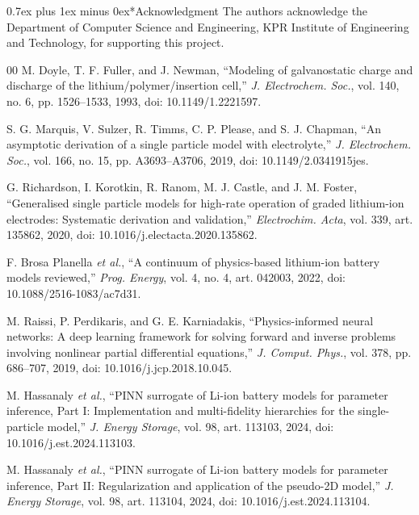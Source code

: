 \documentclass[conference]{IEEEtran}
\makeatletter
\newcommand{\headingfont}{\rmfamily}
\def\section{\@startsection{section}{1}{\z@}{1.5ex plus 1.5ex minus 0.5ex}%
{0.7ex plus 1ex minus 0ex}{\normalfont\headingfont\large\centering\bfseries}}
\makeatother
\begin{document}
\section*{Acknowledgment}
The authors acknowledge the Department of Computer Science and Engineering, KPR Institute of Engineering and Technology, for supporting this project.

\begin{thebibliography}{00}
\setlength{\itemsep}{0pt}
M. Doyle, T. F. Fuller, and J. Newman, ``Modeling of galvanostatic charge and discharge of the lithium/polymer/insertion cell,'' \emph{J. Electrochem. Soc.}, vol. 140, no. 6, pp. 1526--1533, 1993, doi: 10.1149/1.2221597.

S. G. Marquis, V. Sulzer, R. Timms, C. P. Please, and S. J. Chapman, ``An asymptotic derivation of a single particle model with electrolyte,'' \emph{J. Electrochem. Soc.}, vol. 166, no. 15, pp. A3693--A3706, 2019, doi: 10.1149/2.0341915jes.

G. Richardson, I. Korotkin, R. Ranom, M. J. Castle, and J. M. Foster, ``Generalised single particle models for high-rate operation of graded lithium-ion electrodes: Systematic derivation and validation,'' \emph{Electrochim. Acta}, vol. 339, art. 135862, 2020, doi: 10.1016/j.electacta.2020.135862.

F. Brosa Planella \emph{et al.}, ``A continuum of physics-based lithium-ion battery models reviewed,'' \emph{Prog. Energy}, vol. 4, no. 4, art. 042003, 2022, doi: 10.1088/2516-1083/ac7d31.

M. Raissi, P. Perdikaris, and G. E. Karniadakis, ``Physics-informed neural networks: A deep learning framework for solving forward and inverse problems involving nonlinear partial differential equations,'' \emph{J. Comput. Phys.}, vol. 378, pp. 686--707, 2019, doi: 10.1016/j.jcp.2018.10.045.

M. Hassanaly \emph{et al.}, ``PINN surrogate of Li-ion battery models for parameter inference, Part I: Implementation and multi-fidelity hierarchies for the single-particle model,'' \emph{J. Energy Storage}, vol. 98, art. 113103, 2024, doi: 10.1016/j.est.2024.113103.

M. Hassanaly \emph{et al.}, ``PINN surrogate of Li-ion battery models for parameter inference, Part II: Regularization and application of the pseudo-2D model,'' \emph{J. Energy Storage}, vol. 98, art. 113104, 2024, doi: 10.1016/j.est.2024.113104.


\end{thebibliography}
\end{document}
